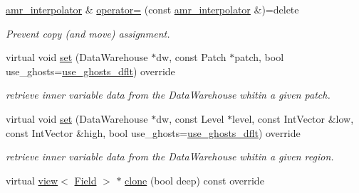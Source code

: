 \begin{DoxyCompactItemize}
\hyperlink{classUintah_1_1PhaseField_1_1detail_1_1amr__interpolator}{amr\+\_\+interpolator} \& \hyperlink{classUintah_1_1PhaseField_1_1detail_1_1amr__interpolator_3_01ScalarField_3_01T_01_4_00_01Problemdf68628a6010a1e1526666730125c372_a6636b05d21c6ca04c38bc2baa3fce356}{operator=} (const \hyperlink{classUintah_1_1PhaseField_1_1detail_1_1amr__interpolator}{amr\+\_\+interpolator} \&)=delete
\begin{DoxyCompactList}\small\item\em Prevent copy (and move) assignment. \end{DoxyCompactList}\item 
virtual void \hyperlink{classUintah_1_1PhaseField_1_1detail_1_1amr__interpolator_3_01ScalarField_3_01T_01_4_00_01Problemdf68628a6010a1e1526666730125c372_a2bd6c99b7578b0f8842dff6deb19caca}{set} (Data\+Warehouse $\ast$dw, const Patch $\ast$patch, bool use\+\_\+ghosts=\hyperlink{classUintah_1_1PhaseField_1_1detail_1_1amr__interpolator_3_01ScalarField_3_01T_01_4_00_01Problemdf68628a6010a1e1526666730125c372_ac8949b5e1e12de5843d579bed1556ddb}{use\+\_\+ghosts\+\_\+dflt}) override
\begin{DoxyCompactList}\small\item\em retrieve inner variable data from the Data\+Warehouse whitin a given patch. \end{DoxyCompactList}\item 
virtual void \hyperlink{classUintah_1_1PhaseField_1_1detail_1_1amr__interpolator_3_01ScalarField_3_01T_01_4_00_01Problemdf68628a6010a1e1526666730125c372_af36ec266ac99db41c8d9addb98999112}{set} (Data\+Warehouse $\ast$dw, const Level $\ast$level, const Int\+Vector \&low, const Int\+Vector \&high, bool use\+\_\+ghosts=\hyperlink{classUintah_1_1PhaseField_1_1detail_1_1amr__interpolator_3_01ScalarField_3_01T_01_4_00_01Problemdf68628a6010a1e1526666730125c372_ac8949b5e1e12de5843d579bed1556ddb}{use\+\_\+ghosts\+\_\+dflt}) override
\begin{DoxyCompactList}\small\item\em retrieve inner variable data from the Data\+Warehouse whitin a given region. \end{DoxyCompactList}\item 
virtual \hyperlink{classUintah_1_1PhaseField_1_1detail_1_1view}{view}$<$ \hyperlink{structUintah_1_1PhaseField_1_1ScalarField}{Field} $>$ $\ast$ \hyperlink{classUintah_1_1PhaseField_1_1detail_1_1amr__interpolator_3_01ScalarField_3_01T_01_4_00_01Problemdf68628a6010a1e1526666730125c372_a69b809d731de3fdfe713ac4321394962}{clone} (bool deep) const override

\end{DoxyCompactItemize}
